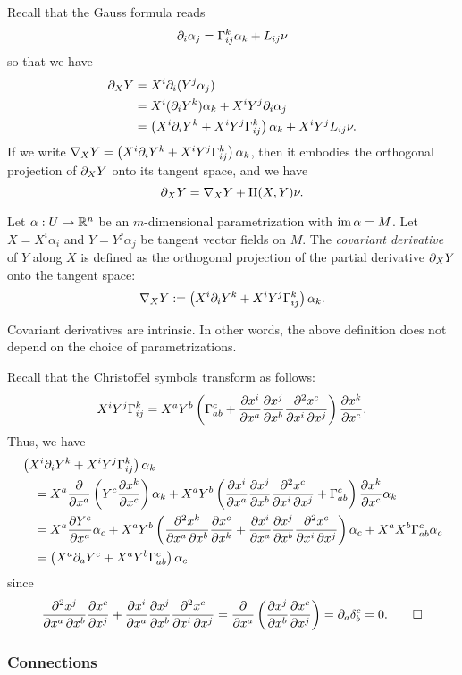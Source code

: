 \documentclass{../exp}
\def\a{\alpha}
\def\II{\mathrm{II}}
\begin{document}
Recall that the Gauss formula reads
\[\pd_i\a_j=\Gamma_{ij}^k\a_k+L_{ij}\nu\]
so that we have
\begin{align*}
\pd_XY
&=X^i\pd_i(Y^j\a_j)\\
&=X^i(\pd_iY^k)\a_k+X^iY^j\pd_i\a_j\\
&=\left(X^i\pd_iY^k+X^iY^j\Gamma_{ij}^k\right)\a_k+X^iY^jL_{ij}\nu.
\end{align*}
If we write $\del_XY=\left(X^i\pd_iY^k+X^iY^j\Gamma_{ij}^k\right)\a_k$, then it embodies the orthogonal projection of $\pd_XY$ onto its tangent space, and we have
\[\pd_XY=\del_XY+\II(X,Y)\nu.\]

\begin{defn}
Let $\a:U\to\R^n$ be an $m$-dimensional parametrization with $\im\a=M$.
Let $X=X^i\a_i$ and $Y=Y^j\a_j$ be tangent vector fields on $M$.
The \emph{covariant derivative} of $Y$ along $X$ is defined as the orthogonal projection of the partial derivative $\pd_XY$ onto the tangent space:
\[\del_XY:=\left(X^i\pd_iY^k+X^iY^j\Gamma_{ij}^k\right)\a_k.\]
\end{defn}

\begin{prop}
Covariant derivatives are intrinsic.
In other words, the above definition does not depend on the choice of parametrizations.
\end{prop}
\begin{pf}
Recall that the Christoffel symbols transform as follows:
\[X^iY^j\Gamma_{ij}^k=X^aY^b\left(\Gamma_{ab}^c+\pd{x^i}{x^a}\pd{x^j}{x^b}\pd[2]{x^c}{x^i}{x^j}\right)\pd{x^k}{x^c}.\]
Thus, we have
\begin{align*}
&\left(X^i\pd_iY^k+X^iY^j\Gamma_{ij}^k\right)\a_k\\
&\quad=X^a\pd{x^a}\left(Y^c\pd{x^k}{x^c}\right)\a_k+X^aY^b\left(\pd{x^i}{x^a}\pd{x^j}{x^b}\pd[2]{x^c}{x^i}{x^j}+\Gamma_{ab}^c\right)\pd{x^k}{x^c}\a_k\\
&\quad=X^a\pd{Y^c}{x^a}\a_c+X^aY^b\left(\pd[2]{x^k}{x^a}{x^b}\pd{x^c}{x^k}+\pd{x^i}{x^a}\pd{x^j}{x^b}\pd[2]{x^c}{x^i}{x^j}\right)\a_c+X^aX^b\Gamma_{ab}^c\a_c\\
&\quad=\left(X^a\pd_aY^c+X^aY^b\Gamma_{ab}^c\right)\a_c
\end{align*}
since
\[\pd[2]{x^j}{x^a}{x^b}\pd{x^c}{x^j}+\pd{x^i}{x^a}\pd{x^j}{x^b}\pd[2]{x^c}{x^i}{x^j}=\pd{x^a}\left(\pd{x^j}{x^b}\pd{x^c}{x^j}\right)=\pd_a\delta_b^c=0.\qedhere\]
\end{pf}



\subsubsection{Connections}
\end{document}

